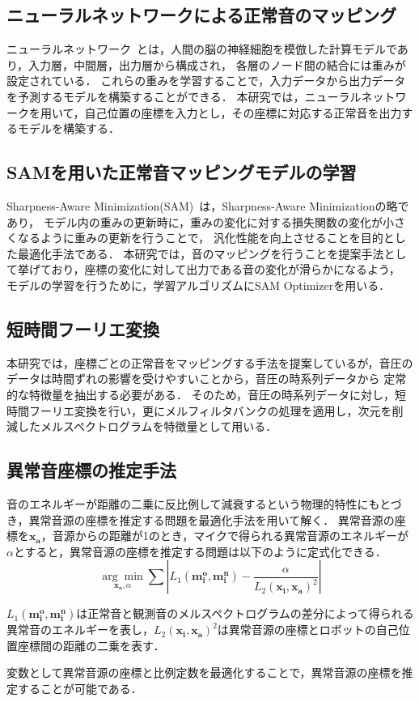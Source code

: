 \documentclass[../main]{subfiles}
\begin{document}
\subsection{ニューラルネットワークによる正常音のマッピング}
ニューラルネットワーク~\cite{Rumelhart1986}とは，人間の脳の神経細胞を模倣した計算モデルであり，入力層，中間層，出力層から構成され，
各層のノード間の結合には重みが設定されている．
これらの重みを学習することで，入力データから出力データを予測するモデルを構築することができる．
本研究では，ニューラルネットワークを用いて，自己位置の座標を入力とし，その座標に対応する正常音を出力するモデルを構築する．
\subsection{SAMを用いた正常音マッピングモデルの学習}
Sharpness-Aware Minimization(SAM)~\cite{Foret2020}は，Sharpness-Aware Minimizationの略であり，
モデル内の重みの更新時に，重みの変化に対する損失関数の変化が小さくなるように重みの更新を行うことで，
汎化性能を向上させることを目的とした最適化手法である．
本研究では，音のマッピングを行うことを提案手法として挙げており，座標の変化に対して出力である音の変化が滑らかになるよう，
モデルの学習を行うために，学習アルゴリズムにSAM Optimizerを用いる．
\subsection{短時間フーリエ変換}
本研究では，座標ごとの正常音をマッピングする手法を提案しているが，音圧のデータは時間ずれの影響を受けやすいことから，音圧の時系列データから
定常的な特徴量を抽出する必要がある．
そのため，音圧の時系列データに対し，短時間フーリエ変換を行い，更にメルフィルタバンクの処理を適用し，次元を削減したメルスペクトログラムを特徴量として用いる．
\subsection{異常音座標の推定手法}
音のエネルギーが距離の二乗に反比例して減衰するという物理的特性にもとづき，異常音源の座標を推定する問題を最適化手法を用いて解く．
異常音源の座標を$\mathbf{x_a}$，音源からの距離が1のとき，マイクで得られる異常音源のエネルギーが$\alpha$とすると，異常音源の座標を推定する問題は以下のように定式化できる．
\begin{equation}
  \underset{\mathbf{x_a}, \alpha}{\arg\min} \sum \left| L_1 (\mathbf{m_i^o}, \mathbf{m_i^n}) - \frac{\alpha}{L_2 (\mathbf{x_i}, \mathbf{x_a})^2} \right|
\end{equation}

$L_1 (\mathbf{m_i^o}, \mathbf{m_i^n})$は正常音と観測音のメルスペクトログラムの差分によって得られる異常音のエネルギーを表し，$L_2 (\mathbf{x_i}, \mathbf{x_a})^2$は異常音源の座標とロボットの自己位置座標間の距離の二乗を表す．

変数として異常音源の座標と比例定数を最適化することで，異常音源の座標を推定することが可能である．
\end{document}
